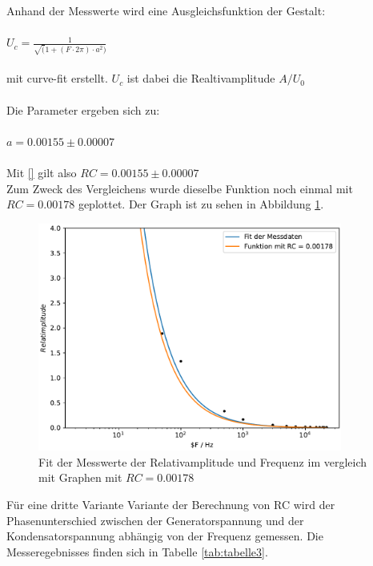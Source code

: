 \newpage

Anhand der Messwerte wird eine Ausgleichsfunktion der Gestalt:\\
\\
$U_c = \frac{1}{\sqrt(1+(F\cdot2\pi)\cdot a^2)}$\\
\\
mit curve-fit \cite{scipy} erstellt. $U_c$ ist dabei die Realtivamplitude $A/U_0$\\
\\
Die Parameter ergeben sich zu:\\
\\
$a = 0.00155 \pm 0.00007$\\
\\
Mit \ref{} gilt also $RC = 0.00155 \pm 0.00007 $\\

Zum Zweck des Vergleichens wurde dieselbe Funktion noch einmal mit $RC = 0.00178$ geplottet. Der Graph ist zu sehen in Abbildung \ref{fig:plot2}.

\begin{figure}
  \centering
  \includegraphics[width = 10cm]{plot2.pdf}
  \caption{Fit der Messwerte der Relativamplitude und Frequenz im vergleich mit Graphen mit $RC = 0.00178$}
  \label{fig:plot2}
\end{figure}

\newpage





Für eine dritte Variante Variante der Berechnung von RC wird der Phasenunterschied zwischen der Generatorspannung und der Kondensatorspannung abhängig von der Frequenz gemessen.
Die Messeregebnisses finden sich in Tabelle \ref{tab:tabelle3}.

